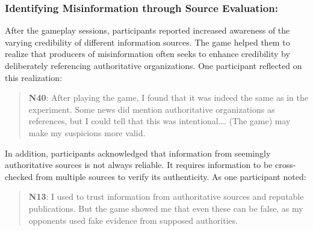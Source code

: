 \subsubsection{Identifying Misinformation through Source Evaluation:}
After the gameplay sessions, participants reported increased awareness of the varying credibility of different information sources. The game helped them to realize that producers of misinformation often seeks to enhance credibility by deliberately referencing authoritative organizations. One participant reflected on this realization:
\begin{quote}
    \textbf{N40}:
    After playing the game, I found that it was indeed the same as in the experiment. Some news did mention authoritative organizations as references, but I could tell that this was intentional…. (The game) may make my suspicions more valid.
\end{quote}
In addition, participants acknowledged that information from seemingly authoritative sources is not always reliable. It requires information to be cross-checked from multiple sources to verify its authenticity. As one participant noted: 
\begin{quote}
\textbf{N13}:
    I used to trust information from authoritative sources and reputable publications. But the game showed me that even these can be false, as my opponents used fake evidence from supposed authorities.
\end{quote}

